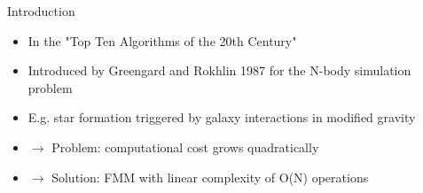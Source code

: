 \begin{frame}{Introduction}
  \begin{itemize}
    \item In the "Top Ten Algorithms of the 20th Century"
    \item Introduced by Greengard and Rokhlin 1987 for the N-body simulation problem
    \item E.g. star formation triggered by galaxy interactions in modified gravity
    \item $\rightarrow$ Problem: computational cost grows quadratically
    \item $\rightarrow$ Solution: FMM with linear complexity of O(N) operations
  \end{itemize}
\end{frame}
